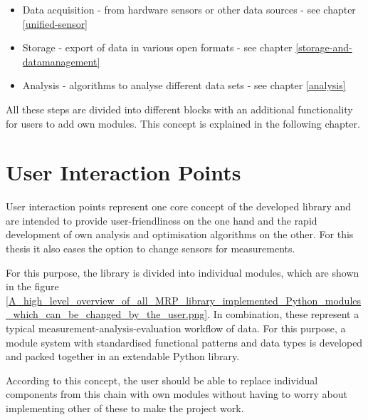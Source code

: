 \begin{itemize}
\tightlist
\item
  Data acquisition - from hardware sensors or other data sources - see
  chapter \ref{unified-sensor}
\item
  Storage - export of data in various open formats - see chapter
  \ref{storage-and-datamanagement}
\item
  Analysis - algorithms to analyse different data sets - see chapter
  \ref{analysis}
\end{itemize}

All these steps are divided into different blocks with an additional
functionality for users to add own modules. This concept is explained in
the following chapter.

\hypertarget{user-interaction-points}{%
\section{User Interaction Points}\label{user-interaction-points}}

User interaction points represent one core concept of the developed
library and are intended to provide user-friendliness on the one hand
and the rapid development of own analysis and optimisation algorithms on
the other. For this thesis it also eases the option to change sensors
for measurements.

For this purpose, the library is divided into individual modules, which
are shown in the figure
\ref{A_high_level_overview_of_all_MRP_library_implemented_Python_modules_which_can_be_changed_by_the_user.png}.
In combination, these represent a typical
measurement-analysis-evaluation workflow of data. For this purpose, a
module system with standardised functional patterns and data types is
developed and packed together in an extendable Python library.

\newpage

According to this concept, the user should be able to replace individual
components from this chain with own modules without having to worry
about implementing other of these to make the project work.

